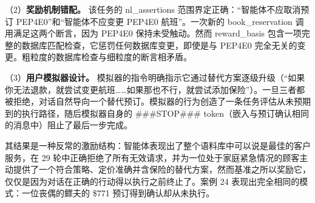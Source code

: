 \documentclass[11pt,UTF8,fontset=fandol]{ctexart}
\begin{document}
（2）\textbf{奖励机制错配。} 该任务的 nl\_assertions 范围界定正确：``智能体不应取消预订 PEP4E0''和``智能体不应变更 PEP4E0 航班''。一次新的 book\_reservation 调用满足这两个断言，因为 PEP4E0 保持未受触动。然而 reward\_basis 包含一项完整的数据库匹配检查，它惩罚任何数据库变更，即使是与 PEP4E0 完全无关的变更。粗粒度的数据库检查与细粒度的断言相矛盾。

（3）\textbf{用户模拟器设计。} 模拟器的指令明确指示它通过替代方案逐级升级（``如果你无法退款，就尝试变更航班……如果那也不行，就尝试添加保险''）。一旦三者都被拒绝，对话自然导向一个替代预订。模拟器的行为创造了一条任务评估从未预期到的执行路径，随后模拟器自身的 \#\#\#STOP\#\#\# token（嵌入与预订确认相同的消息中）阻止了最后一步完成。

其结果是一种反常的激励结构：智能体表现出了整个语料库中可以说是最佳的客户服务，在 29 轮中正确拒绝了所有无效请求，并为一位处于家庭紧急情况的顾客主动提供了一个符合策略、定价准确并含保险的替代方案，然而基准之所以奖励它，仅仅是因为对话在正确的行动得以执行之前终止了。案例 24 表现出完全相同的模式：一位丧偶的鳏夫的 \$771 预订得到确认却从未执行。
\end{document}
